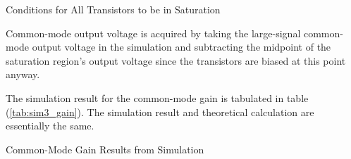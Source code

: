 \begin{table}[h!]
	\centering
	\caption{Conditions for All Transistors to be in Saturation}
	\label{tab:sim3_sat}
\end{table}

\FloatBarrier
{\footnotesize Common-mode output voltage is acquired by taking the large-signal common-mode output voltage in the simulation and subtracting the midpoint of the saturation region's output voltage since the transistors are biased at this point anyway.}
\FloatBarrier

The simulation result for the common-mode gain is tabulated in table (\ref{tab:sim3_gain}).
The simulation result and theoretical calculation are essentially the same.

\FloatBarrier

\begin{table}[h!]
	\centering
	\caption{Common-Mode Gain Results from Simulation}
	\label{tab:sim3_gain}
\end{table}

\FloatBarrier
